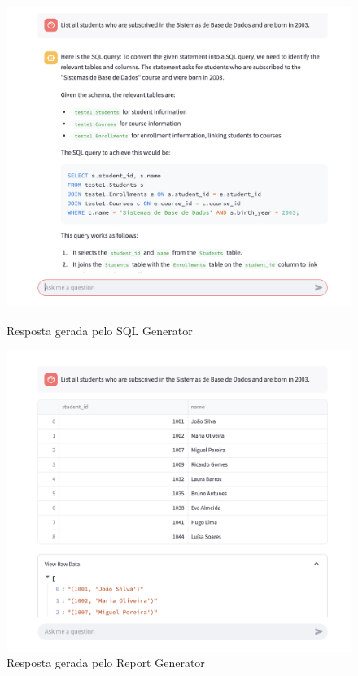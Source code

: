 \documentclass{article}
\begin{document}
\begin{figure}[ht]
    \centering
    \begin{minipage}{0.45\linewidth}
        \centering
        \includegraphics[width=\linewidth]{images/sql_generator1.png}
        \caption{Resposta gerada pelo SQL Generator}
        \label{fig:sql-generator}
    \end{minipage}
    \hspace{0.05\linewidth} %
    \begin{minipage}{0.45\linewidth}
        \centering
        \includegraphics[width=\linewidth]{images/report_generator1.png}
        \caption{Resposta gerada pelo Report Generator}
        \label{fig:report-generator}
    \end{minipage}
\end{figure}
\end{document}
